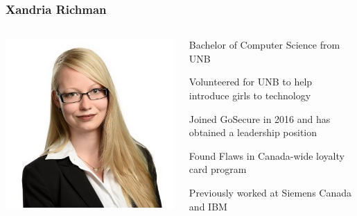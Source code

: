 \documentclass[aspectratio=169]{beamer}
\begin{document}
\begin{frame}
  \frametitle{Xandria Richman}
  \begin{columns}
    \begin{column}{0.5\textwidth}
      \includegraphics[scale=0.33]{xandria_richman}
    \end{column}
    \begin{column}{0.5\textwidth}
      \begin{center}
        \begin{tcolorbox}[title=\href{https://www.linkedin.com/in/xandria-richman-8b0153bb/}{Biography},colback=gray]
          \begin{itemize}
            {\color{black} \tiny
            \item Bachelor of Computer Science from UNB
            \item Volunteered for UNB to help introduce girls to technology
            \item Joined GoSecure in 2016 and has obtained a leadership position
            \item Found Flaws in Canada-wide loyalty card program
            \item Previously worked at Siemens Canada and IBM
            }
          \end{itemize}
        \end{tcolorbox}
      \end{center}
    \end{column}
  \end{columns}
\end{frame}
\end{document}
